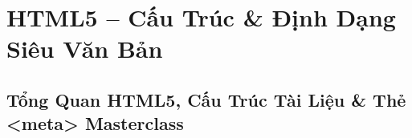 \documentclass[11pt,oneside]{book}
\begin{document}
\part{HTML5 -- Cấu Trúc \& Định Dạng Siêu Văn Bản}


\chapter{Tổng Quan HTML5, Cấu Trúc Tài Liệu \& Thẻ <meta> Masterclass}
\label{chap:html5_fundamentals}
\end{document}
